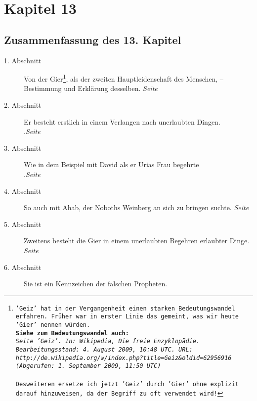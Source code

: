 
\chapter{Kapitel 13} \label{kap13}

\section{Zusammenfassung des 13. Kapitel}

\begin{description}
\item[1. Abschnitt] Von der Gier\footnote{\texttt{'Geiz' hat in der Vergangenheit einen starken
Bedeutungswandel erfahren. Früher war in erster Linie das gemeint, was wir
heute 'Gier' nennen würden.
\\ \textbf{Siehe zum Bedeutungswandel auch:}
\\ \textit{Seite 'Geiz'. In: Wikipedia, Die freie Enzyklopädie.
Bearbeitungsstand: 4. August 2009, 10:48 UTC. URL:
\\ http://de.wikipedia.org/w/index.php?title=Geiz\&oldid=62956916
\\ (Abgerufen: 1. September 2009, 11:50 UTC) }
\\ \\ Desweiteren ersetze ich jetzt 'Geiz' durch 'Gier' ohne explizit darauf
hinzuweisen, da der Begriff zu oft verwendet wird!}}, als der zweiten Hauptleidenschaft des Menschen,
-- Bestimmung und Erklärung desselben.
\dotfill \textit{Seite~\pageref{kap13_ab1}}\\
\item[2. Abschnitt] Er besteht erstlich in einem Verlangen nach unerlaubten
Dingen.\\
.\dotfill \textit{Seite~\pageref{kap13_ab2}}\\
\item[3. Abschnitt] Wie in dem Beispiel mit David als er Urias Frau begehrte\\
.\dotfill \textit{Seite~\pageref{kap13_ab3}}\\
\item[4. Abschnitt] So auch mit Ahab, der Noboths Weinberg an sich zu bringen
suchte.
\dotfill \textit{Seite~\pageref{kap13_ab4}}\\
\item[5. Abschnitt] Zweitens besteht die Gier in einem unerlaubten Begehren
erlaubter Dinge.
\dotfill \textit{Seite~\pageref{kap13_ab5}}\\
\item[6. Abschnitt] Sie ist ein Kennzeichen der falschen Propheten.

\end{description}
